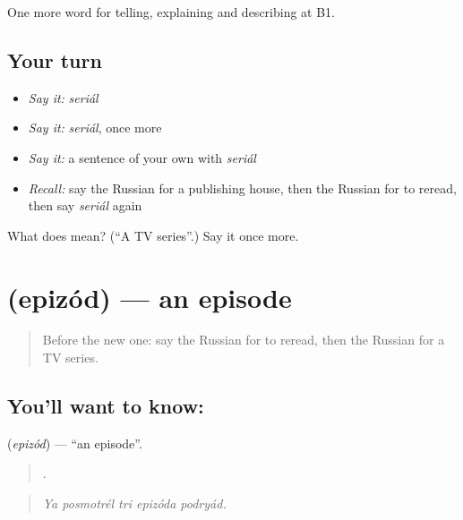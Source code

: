 \begin{grammarlens}[title={What you've built}]
One more word for telling, explaining and describing at B1.
\end{grammarlens}

\subsection*{Your turn}
\begin{itemize}
\raggedright
  \item \emph{Say it:} \emph{seriál}
  \item \emph{Say it:} \emph{seriál}, once more
  \item \emph{Say it:} a sentence of your own with \emph{seriál}
  \item \emph{Recall:} say the Russian for a publishing house, then the Russian for to reread, then say \emph{seriál} again
\end{itemize}

\begin{tcolorbox}[breakable,colback=teal!4,colframe=teal!35!black,title={Before you move on}]
What does  mean? (\textquotedblleft{}A TV series\textquotedblright{}.) Say it once more.
\end{tcolorbox}
\section[\texorpdfstring{\ru{эпизод} (epizód)}{эпизод (epizód)}]{ (epizód) — an episode}

\label{lesson:RU-C527-epizod}



\begin{quote}
Before the new one: say the Russian for to reread, then the Russian for a TV series.
\end{quote}

\subsection*{You'll want to know: }
\textbf{} (\emph{epizód}) — \textquotedblleft{}an episode\textquotedblright{}.

\begin{quote}
    .
\end{quote}

\begin{quote}
\emph{Ya posmotrél tri epizóda podryád.}
\end{quote}

